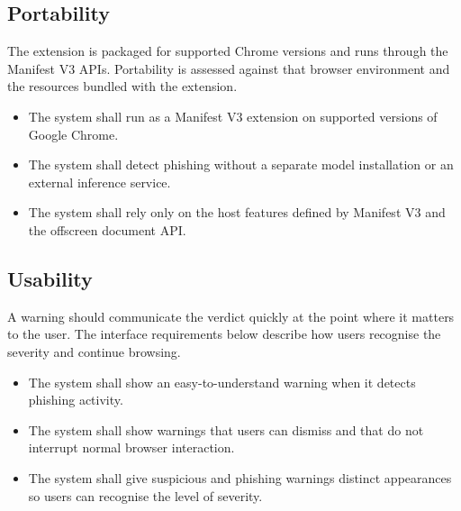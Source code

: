 \documentclass{FastFyp}
\begin{document}
\subsection{Portability}
The extension is packaged for supported Chrome versions and runs through the Manifest V3 APIs. Portability is assessed against that browser environment and the resources bundled with the extension.

\begin{itemize}
    \item The system shall run as a Manifest V3 extension on supported versions of Google Chrome.
    \item The system shall detect phishing without a separate model installation or an external inference service.
    \item The system shall rely only on the host features defined by Manifest V3 and the offscreen document API.
\end{itemize}

\subsection{Usability}
A warning should communicate the verdict quickly at the point where it matters to the user. The interface requirements below describe how users recognise the severity and continue browsing.

\begin{itemize}
    \item The system shall show an easy-to-understand warning when it detects phishing activity.
    \item The system shall show warnings that users can dismiss and that do not interrupt normal browser interaction.
    \item The system shall give suspicious and phishing warnings distinct appearances so users can recognise the level of severity.
\end{itemize}
\end{document}
